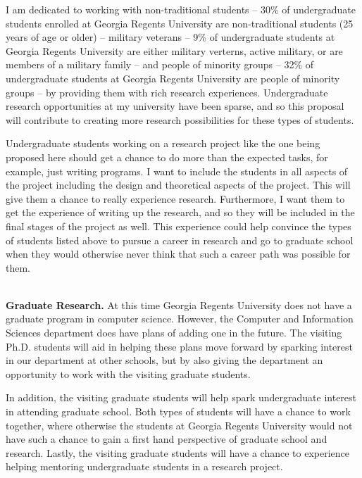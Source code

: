 \begin{full}
I am dedicated to working with non-traditional students -- 30\% of
undergraduate students enrolled at Georgia Regents University are
non-traditional students (25 years of age or older) -- military
veterans -- 9\% of undergraduate students at Georgia Regents
University are either military verterns, active military, or are
members of a military family -- and people of minority groups -- 32\%
of undergraduate students at Georgia Regents University are people of
minority groups -- by providing them with rich research
experiences. Undergraduate research opportunities at my university
have been sparse, and so this proposal will contribute to creating
more research possibilities for these types of students.  %

Undergraduate students working on a research project like the one
being proposed here should get a chance to do more than the expected
tasks, for example, just writing programs.  I want to include the
students in all aspects of the project including the design and
theoretical aspects of the project.  This will give them a chance to
really experience research.  Furthermore, I want them to get the
experience of writing up the research, and so they will be included in
the final stages of the project as well.  This experience could help
convince the types of students listed above to pursue a career in
research and go to graduate school when they would otherwise never
think that such a career path was possible for them.

\ \\
\noindent
\textbf{Graduate Research.} At this time Georgia Regents University
does not have a graduate program in computer science.  However, the
Computer and Information Sciences department does have plans of adding
one in the future.  The visiting Ph.D. students will aid in helping
these plans move forward by sparking interest in our department at
other schools, but by also giving the department an opportunity to
work with the visiting graduate students.

In addition, the visiting graduate students will help spark
undergraduate interest in attending graduate school. Both types of
students will have a chance to work together, where otherwise the
students at Georgia Regents University would not have such a chance to
gain a first hand perspective of graduate school and research.
Lastly, the visiting graduate students will have a chance to
experience helping mentoring undergraduate students in a research
project.


\end{full}
